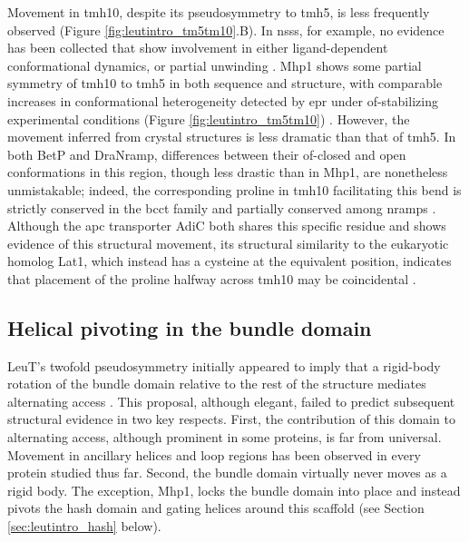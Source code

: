 Movement in \gls{tmh}10, despite its pseudosymmetry to \gls{tmh}5, is less frequently observed (Figure \ref{fig:leutintro_tm5tm10}.B). In \gls{nss}s, for example, no evidence has been collected that show involvement in either ligand-dependent conformational dynamics, or partial unwinding \citep*{Kazmier2014a, Merkle2018, Moeller2019, Nielsen2019}. Mhp1 shows some partial symmetry of \gls{tmh}10 to \gls{tmh}5 in both sequence and structure, with comparable increases in conformational heterogeneity detected by \gls{epr} under \gls{of}-stabilizing experimental conditions (Figure \ref{fig:leutintro_tm5tm10}) \citep*{Kazmier2014, Shimamura2010, Weyand2008}. However, the movement inferred from crystal structures is less dramatic than that of \gls{tmh}5. In both BetP and DraNramp, differences between their \gls{of}-closed and open conformations in this region, though less drastic than in Mhp1, are nonetheless unmistakable; indeed, the corresponding proline in \gls{tmh}10 facilitating this bend is strictly conserved in the \gls{bcct} family and partially conserved among \gls{nramp}s \citep*{Bozzi2021, Schulze2010}. Although the \gls{apc} transporter AdiC both shares this specific residue and shows evidence of this structural movement, its structural similarity to the eukaryotic homolog Lat1, which instead has a cysteine at the equivalent position, indicates that placement of the proline halfway across \gls{tmh}10 may be coincidental \citep*{Fang2009, Yan2021}.

\subsection{Helical pivoting in the bundle domain}\label{sec:leutintro_bundle}

LeuT's twofold pseudosymmetry initially appeared to imply that a rigid-body rotation of the bundle domain relative to the rest of the structure mediates alternating access \citep*{Forrest2008}. This proposal, although elegant, failed to predict subsequent structural evidence in two key respects. First, the contribution of this domain to alternating access, although prominent in some proteins, is far from universal. Movement in ancillary helices and loop regions has been observed in every protein studied thus far. Second, the bundle domain virtually never moves as a rigid body. The exception, Mhp1, locks the bundle domain into place and instead pivots the hash domain and gating helices around this scaffold \citep*{Weyand2008} (see Section \ref{sec:leutintro_hash} below).

